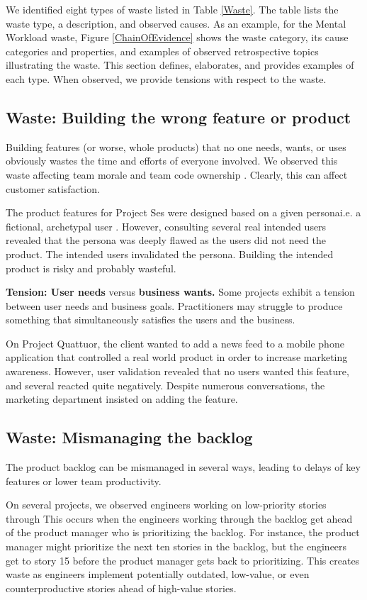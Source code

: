 We identified eight types of waste listed in Table \ref{Waste}. The table lists the waste type, a description, and observed causes. As an example, for the Mental Workload waste, Figure \ref{ChainOfEvidence} shows the waste category, its cause categories and properties, and examples of observed retrospective topics illustrating the waste. This section defines, elaborates, and provides examples of each type. When observed, we provide tensions with respect to the waste.
\subsection{Waste: Building the wrong feature or product}
Building features (or worse, whole products) that no one needs, wants, or uses obviously wastes the time and efforts of everyone involved. We observed this waste affecting team morale and team code ownership \cite{SedanoTeamCodeOwnership}. Clearly, this can affect customer satisfaction. 

The product features for Project Ses were designed based on a given persona\textemdash i.e. a fictional, archetypal user \cite{Grudin2002personas}. However, consulting several real intended users revealed that the persona was deeply flawed as the users did not need the product. The intended users invalidated the persona. Building the intended product is risky and probably wasteful. 

\textbf{Tension: User needs} versus \textbf{business wants.}
Some projects exhibit a tension between user needs and business goals. Practitioners may struggle to produce something that simultaneously satisfies the users and the business.

On Project Quattuor, the client wanted to add a news feed to a mobile phone application that controlled a real world product in order to increase marketing awareness. However, user validation revealed that no users wanted this feature, and several reacted quite negatively. Despite numerous conversations, the marketing department insisted on adding the feature. 
\subsection{Waste: Mismanaging the backlog}
The product backlog can be mismanaged in several ways, leading to delays of key features or lower team productivity. 

On several projects, we observed engineers working on low-priority stories through  This occurs when the engineers working through the backlog get ahead of the product manager who is prioritizing the backlog. For instance, the product manager might prioritize the next ten stories in the backlog, but the engineers get to story 15 before the product manager gets back to prioritizing. This creates waste as engineers implement potentially outdated, low-value, or even counterproductive stories ahead of high-value stories.   

